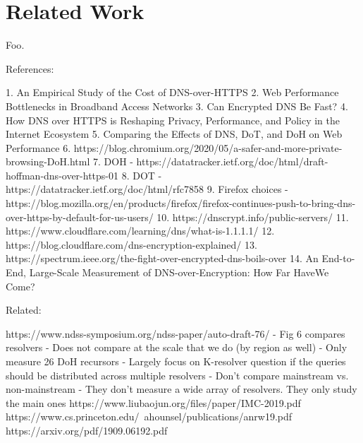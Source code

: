 \section{Related Work}\label{sec:related}

Foo\cite{reich2013modular}.

References:

1.	An Empirical Study of the Cost of DNS-over-HTTPS
2.	Web Performance Bottlenecks in Broadband Access Networks
3.	Can Encrypted DNS Be Fast?
4.	How DNS over HTTPS is Reshaping Privacy, Performance, and Policy in the Internet Ecosystem
5.	Comparing the Effects of DNS, DoT, and DoH on Web Performance
6.	https://blog.chromium.org/2020/05/a-safer-and-more-private-browsing-DoH.html
7.	DOH - https://datatracker.ietf.org/doc/html/draft-hoffman-dns-over-https-01
8.	DOT - https://datatracker.ietf.org/doc/html/rfc7858 
9.	Firefox choices - https://blog.mozilla.org/en/products/firefox/firefox-continues-push-to-bring-dns-over-https-by-default-for-us-users/ 
10.	https://dnscrypt.info/public-servers/
11.	https://www.cloudflare.com/learning/dns/what-is-1.1.1.1/
12.	https://blog.cloudflare.com/dns-encryption-explained/
13.	https://spectrum.ieee.org/the-fight-over-encrypted-dns-boils-over
14.	An End-to-End, Large-Scale Measurement of DNS-over-Encryption: How Far HaveWe Come?



Related:

https://www.ndss-symposium.org/ndss-paper/auto-draft-76/
	- Fig 6 compares resolvers
	- Does not compare at the scale that we do (by region as well)
	- Only measure 26 DoH recursors
	- Largely focus on K-resolver question if the queries should be distributed across multiple resolvers
	- Don't compare mainstream vs. non-mainstream
	- They don't measure a wide array of resolvers. They only study the main ones 
https://www.liubaojun.org/files/paper/IMC-2019.pdf
https://www.cs.princeton.edu/~ahounsel/publications/anrw19.pdf
https://arxiv.org/pdf/1909.06192.pdf
